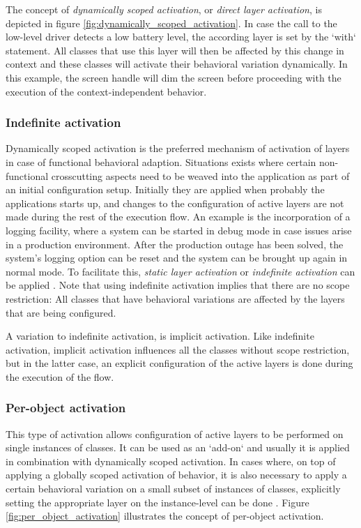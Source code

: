 \documentclass{acm_proc_article-sp}
\begin{document}
The concept of \textit{dynamically scoped activation}, or \textit{direct layer activation}, is depicted in figure \ref{fig:dynamically_scoped_activation}. In case the call to the low-level driver detects a low battery level, the according layer is set by the `with` statement. All classes that use this layer will then be affected by this change in context and these classes will activate their behavioral variation dynamically. In this example, the screen handle will dim the screen before proceeding with the execution of the context-independent behavior.

\subsubsection{Indefinite activation}
\label{indefinite_activation}
Dynamically scoped activation is the preferred mechanism of activation of layers in case of functional behavioral adaption. Situations exists where certain non-functional crosscutting aspects need to be weaved into the application as part of an initial configuration setup. Initially they are applied when probably the applications starts up, and changes to the configuration of active layers are not made during the rest of the execution flow. An example is the incorporation of a logging facility, where a system can be started in debug mode in case issues arise in a production environment. After the production outage has been solved, the system's logging option can be reset and the system can be brought up again in normal mode. To facilitate this, \textit{static layer activation} or \textit{indefinite activation} can be applied  \cite{SALVANESCHI20121801}. Note that using indefinite activation implies that there are no scope restriction: All classes that have behavioral variations are affected by the layers that are being configured. 

A variation to indefinite activation, is implicit activation. Like indefinite activation, implicit activation influences all the classes without scope restriction, but in the latter case, an explicit configuration of the active layers is done during the execution of the flow. 

\subsubsection{Per-object activation}
\label{per_object_activation}
This type of activation allows configuration of active layers to be performed on single instances of classes. It can be used as an `add-on` and usually it is applied in combination with dynamically scoped activation. In cases where, on top of applying a  globally scoped activation of behavior, it is also necessary to apply a certain behavioral variation on a small subset of instances of classes, explicitly setting the appropriate layer on the instance-level can be done \cite{SALVANESCHI20121801}. Figure \ref{fig:per_object_activation} illustrates the concept of per-object activation.
\end{document}
